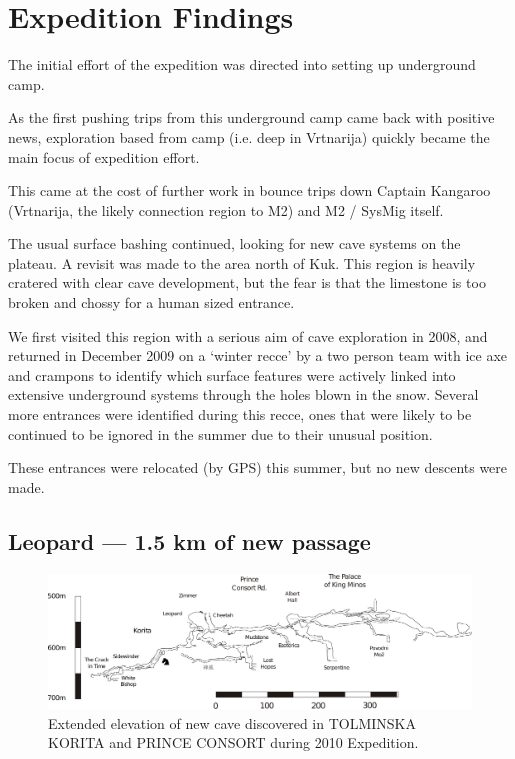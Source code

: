 \section{Expedition Findings}\label{expedition-findings-1}

The initial effort of the expedition was directed into setting up
underground camp.

As the first pushing trips from this underground camp came back with
positive news, exploration based from camp (i.e. deep in Vrtnarija)
quickly became the main focus of expedition effort.

This came at the cost of further work in bounce trips down Captain
Kangaroo (Vrtnarija, the likely connection region to M2) and M2 / SysMig
itself.

The usual surface bashing continued, looking for new cave systems on the
plateau. A revisit was made to the area north of Kuk. This region is
heavily cratered with clear cave development, but the fear is that the
limestone is too broken and chossy for a human sized entrance.

We first visited this region with a serious aim of cave exploration in
2008, and returned in December 2009 on a `winter recce' by a two person
team with ice axe and crampons to identify which surface features were
actively linked into extensive underground systems through the holes
blown in the snow. Several more entrances were identified during this
recce, ones that were likely to be continued to be ignored in the summer
due to their unusual position.

These entrances were relocated (by GPS) this summer, but no new descents
were made.

\subsection{Leopard --- 1.5 km of new
passage}\label{leopard-1.5-km-of-new-passage}

\begin{figure}
\centering
\includegraphics[width=0.9\columnwidth]{2010/2010_new_stuff_extended_extraction}
\caption{Extended elevation of new cave discovered in \textsc{TOLMINSKA KORITA} and \textsc{PRINCE
CONSORT} during 2010 Expedition.}
\end{figure}

